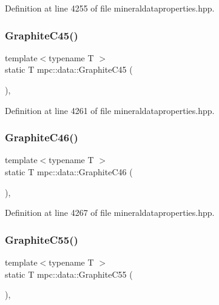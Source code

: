 Definition at line 4255 of file mineraldataproperties.\+hpp.

\mbox{\label{namespacempc_1_1data_af0769b55ee5537149e740437ecdf220c}} 
\subsubsection{\texorpdfstring{Graphite\+C45()}{GraphiteC45()}}
{\footnotesize\ttfamily template$<$typename T $>$ \\
static T mpc\+::data\+::\+Graphite\+C45 (\begin{DoxyParamCaption}{ }\end{DoxyParamCaption})\hspace{0.3cm}{\ttfamily [inline]}, {\ttfamily [static]}}



Definition at line 4261 of file mineraldataproperties.\+hpp.

\mbox{\label{namespacempc_1_1data_a3a040f5f3730d284f8c12ffd21e1f09b}} 
\subsubsection{\texorpdfstring{Graphite\+C46()}{GraphiteC46()}}
{\footnotesize\ttfamily template$<$typename T $>$ \\
static T mpc\+::data\+::\+Graphite\+C46 (\begin{DoxyParamCaption}{ }\end{DoxyParamCaption})\hspace{0.3cm}{\ttfamily [inline]}, {\ttfamily [static]}}



Definition at line 4267 of file mineraldataproperties.\+hpp.

\mbox{\label{namespacempc_1_1data_a7fbd88b9198cf5794ab5d3a8d2627595}} 
\subsubsection{\texorpdfstring{Graphite\+C55()}{GraphiteC55()}}
{\footnotesize\ttfamily template$<$typename T $>$ \\
static T mpc\+::data\+::\+Graphite\+C55 (\begin{DoxyParamCaption}{ }\end{DoxyParamCaption})\hspace{0.3cm}{\ttfamily [inline]}, {\ttfamily [static]}}



